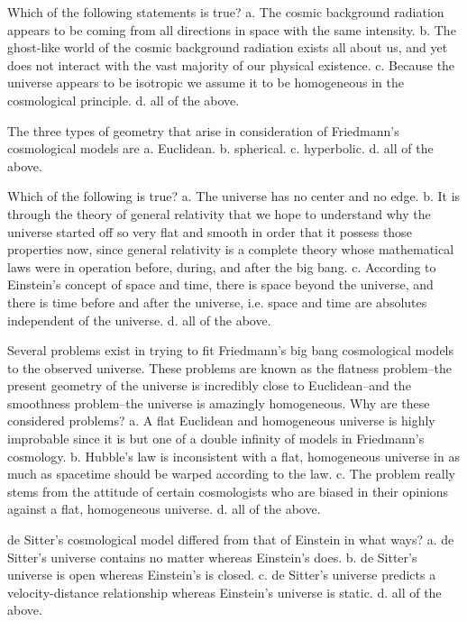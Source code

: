     Which of the following statements is true?
    a. The cosmic background radiation appears to be coming from all directions in space with the same intensity.
    b. The ghost-like world of the cosmic background radiation exists all about us, and yet does not interact with the vast majority of our physical existence.
    c. Because the universe appears to be isotropic we assume it to be homogeneous in the cosmological principle.
    d. all of the above.

    The three types of geometry that arise in consideration of Friedmann's cosmological models are
    a. Euclidean.
    b. spherical.
    c. hyperbolic.
    d. all of the above.

    Which of the following is true?
    a. The universe has no center and no edge.
    b. It is through the theory of general relativity that we hope to understand why the universe started off so very flat and smooth in order that it possess those properties now, since general relativity is a complete theory whose mathematical laws were in operation before, during, and after the big bang.
    c. According to Einstein's concept of space and time, there is space beyond the universe, and there is time before and after the universe, i.e. space and time are absolutes independent of the universe.
    d. all of the above.

    Several problems exist in trying to fit Friedmann's big bang cosmological models to the observed universe. These problems are known as the flatness problem--the present geometry of the universe is incredibly close to Euclidean--and the smoothness problem--the universe is amazingly homogeneous. Why are these considered problems?
    a. A flat Euclidean and homogeneous universe is highly improbable since it is but one of a double infinity of models in Friedmann's cosmology.
    b. Hubble's law is inconsistent with a flat, homogeneous universe in as much as spacetime should be warped according to the law.
    c. The problem really stems from the attitude of certain cosmologists who are biased in their opinions against a flat, homogeneous universe.
    d. all of the above.

    de Sitter's cosmological model differed from that of Einstein in what ways?
    a. de Sitter's universe contains no matter whereas Einstein's does.
    b. de Sitter's universe is open whereas Einstein's is closed.
    c. de Sitter's universe predicts a velocity-distance relationship whereas Einstein's universe is static.
    d. all of the above.


